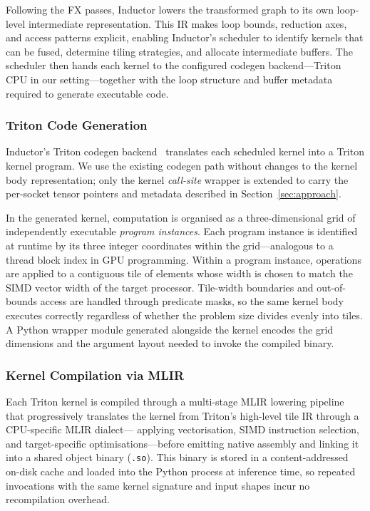 \documentclass[conference]{IEEEtran}
\begin{document}
Following the FX passes, Inductor lowers the transformed graph to its
own loop-level intermediate representation.  This IR makes loop bounds,
reduction axes, and access patterns explicit, enabling Inductor's
scheduler to identify kernels that can be fused, determine tiling
strategies, and allocate intermediate buffers.  The scheduler then
hands each kernel to the configured codegen backend—Triton CPU in our
setting—together with the loop structure and buffer metadata required to
generate executable code.

\subsubsection{Triton Code Generation}
\label{sec:bg_triton_cg}

Inductor's Triton codegen backend~\cite{ansel2024pytorch2} translates
each scheduled kernel into a Triton kernel program.
We use the existing codegen path without changes to the kernel body
representation; only the kernel \emph{call-site} wrapper is extended to
carry the per-socket tensor pointers and metadata described in
Section~\ref{sec:approach}.

In the generated kernel, computation is organised as a
three-dimensional grid of independently executable \emph{program
instances}.  Each program instance is identified at runtime by its
three integer coordinates within the grid—analogous to a thread block
index in GPU programming.  Within a program instance, operations are
applied to a contiguous tile of elements whose width is chosen to match
the SIMD vector width of the target processor.  Tile-width boundaries
and out-of-bounds access are handled through predicate masks, so the
same kernel body executes correctly regardless of whether the problem
size divides evenly into tiles.  A Python wrapper module generated
alongside the kernel encodes the grid dimensions and the argument
layout needed to invoke the compiled binary.

\subsubsection{Kernel Compilation via MLIR}
\label{sec:bg_compilation}

Each Triton kernel is compiled through a multi-stage MLIR lowering
pipeline~\cite{lattner2021mlir} that progressively translates the kernel
from Triton's high-level tile IR through a CPU-specific MLIR dialect—
applying vectorisation, SIMD instruction selection, and target-specific
optimisations—before emitting native assembly and linking it into a
shared object binary (\texttt{.so}).
This binary is stored in a content-addressed on-disk cache and loaded
into the Python process at inference time, so repeated invocations with
the same kernel signature and input shapes incur no recompilation
overhead.
\end{document}
